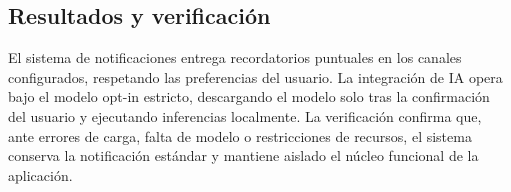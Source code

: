 \subsection{Resultados y verificación}
El sistema de notificaciones entrega recordatorios puntuales en los canales configurados, respetando las preferencias del usuario. La integración de IA opera bajo el modelo opt-in estricto, descargando el modelo solo tras la confirmación del usuario y ejecutando inferencias localmente. La verificación confirma que, ante errores de carga, falta de modelo o restricciones de recursos, el sistema conserva la notificación estándar y mantiene aislado el núcleo funcional de la aplicación.
